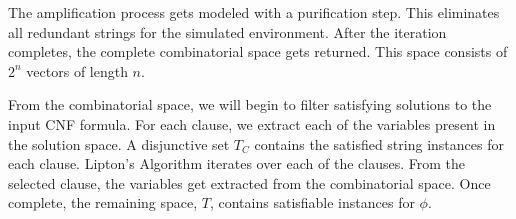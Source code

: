 The amplification process gets modeled with a purification step.  This eliminates all redundant strings for the simulated environment.  After the iteration completes, the complete combinatorial space gets returned. This space consists of $2^n$ vectors of length $n$. 

From the combinatorial space, we will begin to filter satisfying solutions to the input CNF formula.  For each clause, we extract each of the variables present in the solution space.  A disjunctive set $T_C$ contains the satisfied string instances for each clause.  {\sc Lipton's Algorithm} iterates over each of the clauses.  From the selected clause, the variables get extracted from the combinatorial space.  Once complete, the remaining space, $T$, contains satisfiable instances for $\phi$.
%
%
%
%
%
%
%
	
